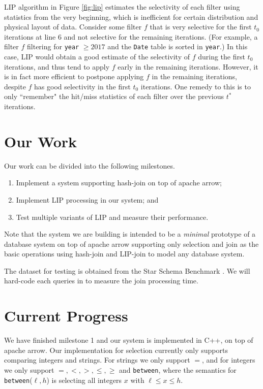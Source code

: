 \documentclass[10pt]{article}
\begin{document}
LIP algorithm in Figure \ref{fig:lip} estimates the selectivity of each filter using statistics from the very beginning, which is inefficient for certain distribution and physical layout of data. Consider some filter $f$ that is very selective for the first $t_0$ iterations at line 6 and not selective for the remaining iterations. (For example, a filter $f$ filtering for \texttt{year} $\geq 2017$ and the \texttt{Date} table is sorted in \texttt{year}.) In this case, LIP would obtain a good estimate of the selectivity of $f$ during the first $t_0$ iterations, and thus tend to apply $f$ early in the remaining iterations. However, it is in fact more efficient to postpone applying $f$ in the remaining iterations, despite $f$ has good selectivity in the first $t_0$ iterations. One remedy to this is to only ``remember" the hit/miss statistics of each filter over the previous $t^*$ iterations.


\section{Our Work}

Our work can be divided into the following milestones.

\begin{enumerate}
	\item Implement a system supporting hash-join on top of apache arrow;
	\item Implement LIP processing in our system; and
	\item Test multiple variants of LIP and measure their performance.
\end{enumerate}


Note that the system we are building is intended to be a \textit{minimal} prototype of a database system on top of apache arrow supporting only selection and join as the basic operations using hash-join and LIP-join to model any database system. 

The dataset for testing is obtained from the Star Schema Benchmark \cite{o2009star}. We will hard-code each queries in \cite{o2009star} to measure the join processing time.

\section{Current Progress}

We have finished milestone 1 and our system is implemented in C++, on top of apache arrow. Our implementation for selection currently only supports comparing integers and strings. For strings we only support $=$, and for integers we only support $=, <, >, \leq, \geq$ and \texttt{between}, where the semantics for \texttt{between}($\ell, h$) is selecting all integers $x$ with $\ell \leq x \leq h$. 
\end{document}
